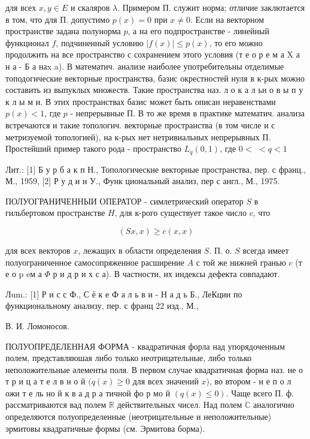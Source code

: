 \documentclass[10pt]{article}
\begin{document}
для всех $x, y \in E$ и скаляров $\lambda$. Примером П. служит норма; отличие заклютается в том, что для П. допустимо $p(x)=0$ при $x \neq 0$. Если на векторном пространстве задана полунорма $p$, а на его подпространстве - линейный функционал $f$, подчиненный условию $|f(x)| \leqslant p(x)$, то его можно продолжить на все пространство с сохранением этого условия (т е о р е м а X а н а - Б а наx a). В математич. анализе наиболее употребительны отделимые топодогические векторные пространства, базис окрестностей нуля в к-рых можно составить из выпуклых множеств. Такие пространства наз. л о к а л ьн о в ы п у к л ы м и. В этих пространствах базис может быть описан неравенствами $p(x)<1$, где $p$ - непрерывные П. В то же время в практике математич. анализа встречаются и такие топологич. векторные пространства (в том числе и с метризуемой топологией), на к-рых нет нетривиальных непрерывных П. Простейший пример такого рода - пространство $L_{q}(0,1)$, где $0<$ $<q<1$



Лит.: [1] Б у р б а к п Н., Топологические векторные пространства, пер. с франц., М., 1959, [2] Р у д и н У., Функ циональный анализ, пер с англ., М., 1975.



ПОЛУОГРАНИЧЕННЫИ ОПЕРАТОР - симлетрический оператор $S$ в гильбертовом пространстве $H$, для к-рого существует такое число $c$, что



\[

(S x, x) \geqslant c(x, x)

\]



для всех векторов $x$, лежащих в области определения $S$. П. о. $S$ всегда имеет полуограниченное самосопряженное расширение $A$ с той же нижней гранью $c$ (т е о p eм а $\Phi$ р и д р и х с а). В частности, их индексы дефекта совпадают.



Лum.: [1] Р и с с Ф., С ё к е Ф а л ь в и - Н а д ь Б., ЛеКции по функциональному анализу, пер. с франц 22 изд., М.,

В. И. Ломоносов.



ПОЛУОПРЕДЕЛЕННАЯ ФОРМА - квадратичная форла над упорядоченным полем, представляюшая либо только неотрицательные, либо только неположительные әлементы поля. В первом случае квадратичная форма наз. не о т р и ц а т е л в н о й $(q(x) \geqslant 0$ для всех значений $x)$, во втором - н е п о л ожи т е ль но й к в а д р а тичной фо р мо й $(q(x) \leqslant 0)$. Чаще всего П. ф. рассматриваются вад полем $\mathbb{R}$ действительных чисел. Над полем $\mathbb{C}$ аналогично определяются полуопределенные (неотрицательные и неположительные) эрмитовы квадратичные формы (см. Эрмитова борма).
\end{document}
